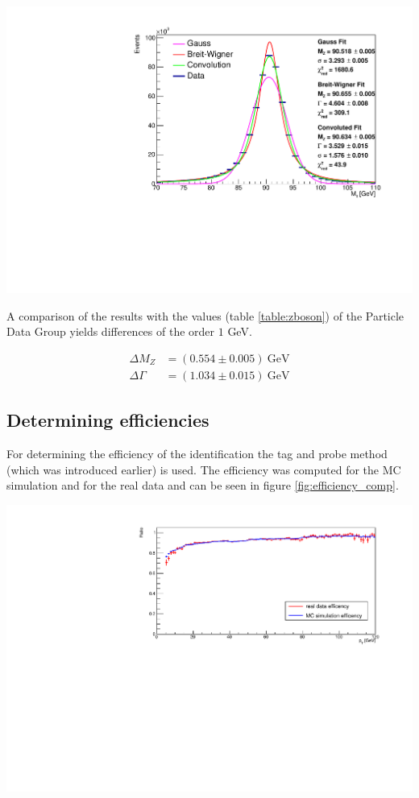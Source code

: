 \documentclass[12pt, a4paper, bibliography=totoc]{scrartcl}
\begin{document}
\begin{multicols}{2}
\begin{center}
	\includegraphics[width=\linewidth]{fig/invar_z_mass.pdf}
	\label{fig:fit}
\end{center}

A comparison of the results with the values (table \ref{table:zboson}) of the Particle Data Group yields differences of the order $1$ GeV.
 
\begin{align}
\Delta M_Z &= (0.554 \pm 0.005) \ \text{GeV}\\
\Delta \Gamma &= (1.034 \pm 0.015) \ \text{GeV}
\end{align}
 
\subsection{Determining efficiencies}
For determining the efficiency of the identification the tag and probe method (which was introduced earlier) is used.
The efficiency was computed for the MC simulation and for the real data and can be seen in figure \ref{fig:efficiency_comp}.

\begin{center}
    \includegraphics[width=\linewidth]{fig/efficency_comparison.pdf}
    \label{fig:efficiency_comp}
\end{center}


\end{multicols}
\end{document}

